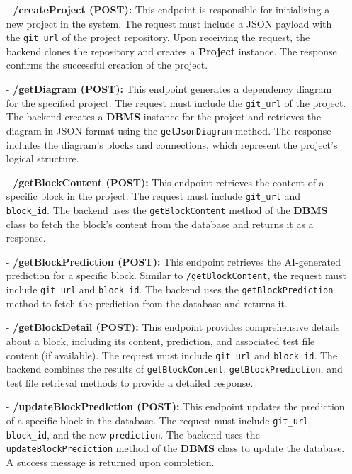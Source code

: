 \begin{itemize}
    \item[-] \textbf{/createProject (POST):} 
    This endpoint is responsible for initializing a new project in the system. The request must include a JSON payload with the \texttt{git\_url} of the project repository. Upon receiving the request, the backend clones the repository and creates a \textbf{Project} instance. The response confirms the successful creation of the project.

    \item[-] \textbf{/getDiagram (POST):} 
    This endpoint generates a dependency diagram for the specified project. The request must include the \texttt{git\_url} of the project. The backend creates a \textbf{DBMS} instance for the project and retrieves the diagram in JSON format using the \texttt{getJsonDiagram} method. The response includes the diagram's blocks and connections, which represent the project's logical structure.

    \item[-] \textbf{/getBlockContent (POST):} 
    This endpoint retrieves the content of a specific block in the project. The request must include \texttt{git\_url} and \texttt{block\_id}. The backend uses the \texttt{getBlockContent} method of the \textbf{DBMS} class to fetch the block's content from the database and returns it as a response.

    \item[-] \textbf{/getBlockPrediction (POST):} 
    This endpoint retrieves the AI-generated prediction for a specific block. Similar to \texttt{/getBlockContent}, the request must include \texttt{git\_url} and \texttt{block\_id}. The backend uses the \texttt{getBlockPrediction} method to fetch the prediction from the database and returns it.

    \item[-] \textbf{/getBlockDetail (POST):} 
    This endpoint provides comprehensive details about a block, including its content, prediction, and associated test file content (if available). The request must include \texttt{git\_url} and \texttt{block\_id}. The backend combines the results of \texttt{getBlockContent}, \texttt{getBlockPrediction}, and test file retrieval methods to provide a detailed response.

    \item[-] \textbf{/updateBlockPrediction (POST):} 
    This endpoint updates the prediction of a specific block in the database. The request must include \texttt{git\_url}, \texttt{block\_id}, and the new \texttt{prediction}. The backend uses the \texttt{updateBlockPrediction} method of the \textbf{DBMS} class to update the database. A success message is returned upon completion.


\end{itemize}

